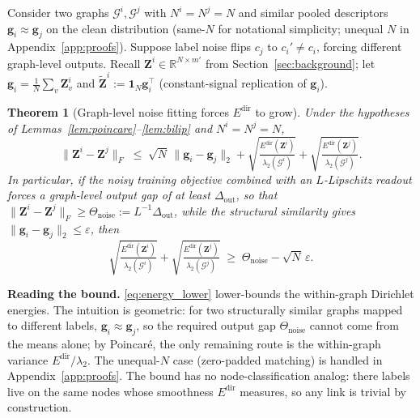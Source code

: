 \documentclass{article}
\newtheorem{theorem}{Theorem}
\theoremstyle{definition}
\newcommand{\Edir}{E^{\text{dir}}}
\begin{document}
Consider two graphs $\mathcal{G}^i,\mathcal{G}^j$ with $N^i=N^j=N$ and similar pooled descriptors $\mathbf{g}_i\approx\mathbf{g}_j$ on the clean distribution (same-$N$ for notational simplicity; unequal $N$ in Appendix~\ref{app:proofs}). Suppose label noise flips $c_j$ to $c_i'\neq c_i$, forcing different graph-level outputs. Recall $\mathbf{Z}^i\in\mathbb{R}^{N\times m'}$ from Section~\ref{sec:background}; let $\mathbf{g}_i=\frac{1}{N}\sum_v\mathbf{Z}^i_v$ and $\widetilde{\mathbf{Z}}^i:=\mathbf{1}_N\mathbf{g}_i^\top$ (constant-signal replication of $\mathbf{g}_i$).

\begin{theorem}[Graph-level noise fitting forces $\Edir$ to grow]
\label{thm:noise_forces_energy}
Under the hypotheses of Lemmas~\ref{lem:poincare}--\ref{lem:bilip} and $N^i=N^j=N$,
\begin{equation}
\|\mathbf{Z}^i-\mathbf{Z}^j\|_F \;\le\; \sqrt{N}\,\|\mathbf{g}_i-\mathbf{g}_j\|_2 + \sqrt{\tfrac{\Edir(\mathbf{Z}^i)}{\lambda_2(\mathcal{G}^i)}}+\sqrt{\tfrac{\Edir(\mathbf{Z}^j)}{\lambda_2(\mathcal{G}^j)}}.
\label{eq:noise_bound}
\end{equation}
In particular, if the noisy training objective combined with an $L$-Lipschitz readout forces a graph-level output gap of at least $\Delta_{\text{out}}$, so that $\|\mathbf{Z}^i-\mathbf{Z}^j\|_F\geq\Theta_{\text{noise}}:=L^{-1}\Delta_{\text{out}}$, while the structural similarity gives $\|\mathbf{g}_i-\mathbf{g}_j\|_2\leq\varepsilon$, then
\begin{equation}
\sqrt{\tfrac{\Edir(\mathbf{Z}^i)}{\lambda_2(\mathcal{G}^i)}}+\sqrt{\tfrac{\Edir(\mathbf{Z}^j)}{\lambda_2(\mathcal{G}^j)}} \;\geq\; \Theta_{\text{noise}}-\sqrt{N}\,\varepsilon.
\label{eq:energy_lower}
\end{equation}
\end{theorem}

\textbf{Reading the bound.} \eqref{eq:energy_lower} lower-bounds the within-graph Dirichlet energies. The intuition is geometric: for two structurally similar graphs mapped to different labels, $\mathbf{g}_i\approx\mathbf{g}_j$, so the required output gap $\Theta_{\text{noise}}$ cannot come from the means alone; by Poincar\'e, the only remaining route is the within-graph variance $\Edir/\lambda_2$. The unequal-$N$ case (zero-padded matching) is handled in Appendix~\ref{app:proofs}. The bound has no node-classification analog: there labels live on the same nodes whose smoothness $\Edir$ measures, so any link is trivial by construction.
\end{document}

